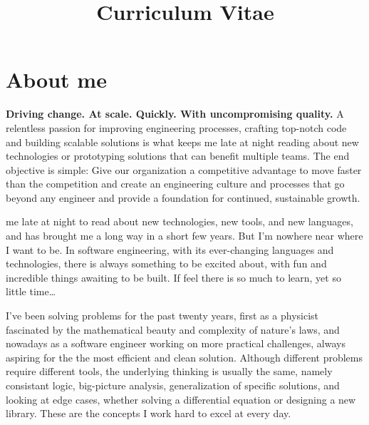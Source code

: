 \documentclass[11pt,a4paper,sans]{moderncv}        %
\title{Curriculum Vitae}                               %
\begin{document}
\makecvtitle

\section{About me}

    \textbf{Driving change. At scale. Quickly. With uncompromising quality.} A relentless passion for improving engineering processes, crafting top-notch code and building scalable solutions is
    what keeps me late at night reading about new technologies or prototyping solutions that can benefit multiple teams. The end objective is simple: Give our organization a competitive advantage to move
    faster than the competition and create an engineering culture and processes that go beyond any engineer and provide a foundation for continued, sustainable growth.

     me late at night to read about new technologies, new tools, and new languages, and has brought me a long way in a short few years.
     But I'm nowhere near where I want to be. In software engineering, with its ever-changing languages and technologies, there is always something to be excited about,
     with fun and incredible things awaiting to be built. If feel there is so much to learn, yet so little time\ldots \newline{}


    I've been solving problems for the past twenty years, first as a physicist fascinated by the mathematical beauty and complexity of nature's laws, and nowadays as a software
    engineer working on more practical challenges, always aspiring for the the most efficient and clean solution. Although different problems require different tools, the underlying thinking
    is usually the same, namely consistant logic, big-picture analysis, generalization of specific solutions, and looking at edge cases, whether solving a
    differential equation or designing a new library. These are the concepts I work hard to excel at every day.
\end{document}
